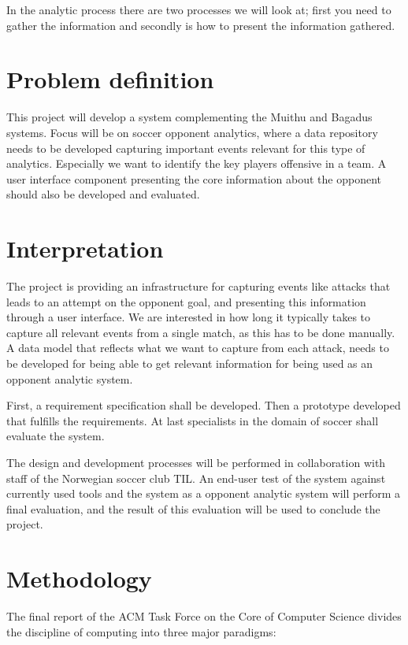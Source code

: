 In the analytic process there are two processes we will look at; first you need to gather the information and secondly is how to present the information gathered. 

\section{Problem definition}

This project will develop a system complementing the Muithu and Bagadus systems. Focus will be on soccer opponent analytics, where a data repository needs to be developed capturing important events relevant for this type of analytics. Especially we want to identify the key players offensive in a team. A user interface component presenting the core information about the opponent should also be developed and evaluated.

\section{Interpretation}

The project is providing an infrastructure for capturing events like attacks that leads to an attempt on the opponent goal, and presenting this information through a user interface. We are interested in how long it typically takes to capture all relevant events from a single match, as this has to be done manually. A data model that reflects what we want to capture from each attack, needs to be developed for being able to get relevant information for being used as an opponent analytic system.

First, a requirement specification shall be developed. Then a prototype developed that fulfills the requirements. At last specialists in the domain of soccer shall evaluate the system.

The design and development processes will be performed in collaboration with staff of the Norwegian soccer club \ac{TIL}. An end-user test of the system against currently used tools and the system as a opponent analytic system will perform a final evaluation, and the result of this evaluation will be used to conclude the project.

\section{Methodology}

The final report of the ACM Task Force on the Core of Computer Science \cite{computing_as_a_discipline} divides the discipline of computing into three major paradigms:

